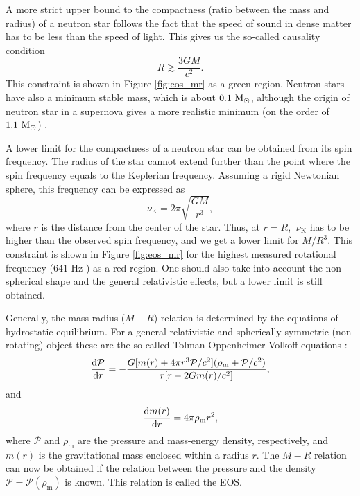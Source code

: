 \documentclass{wihuri}
\def\be{\begin{equation}}
\def\ee{\end{equation}}
\def\msun{{\rm M_{\odot}}}
\def\d{{\rm d}}
\begin{document}
A more strict upper bound to the compactness (ratio between the mass and radius) of a neutron star follows
the fact \cite{rhoades} %
that the speed of sound in dense matter has to be less than the speed of light. This gives us the so-called causality condition
\be \label{eq:causality}
 R \gtrsim \frac{3GM}{c^{2}}.
\ee 
This constraint is shown in Figure \ref{fig:eos_mr} as a green region. Neutron stars have also a minimum stable mass, which is about $0.1 ~\msun$, although the origin of neutron star in a supernova gives a more realistic minimum (on the order of $1.1 ~\msun$) \cite{lattimer2013}.

A lower limit for the compactness of a neutron star can be obtained from its spin frequency. The radius of the star cannot extend further than the point where the spin frequency equals to the Keplerian frequency. Assuming a rigid Newtonian sphere, this frequency can be expressed as
\be \label{eq:keplerian}
\nu_{\mathrm{K}} = 2 \pi \sqrt{\frac{GM}{r^{3}}},
\ee 
where $r$ is the distance from the center of the star. Thus, at $r=R$, $~\nu_{\mathrm{K}}$ has to be higher than the observed spin frequency, and we get a lower limit for $M/R^{3}$. This constraint is shown in Figure \ref{fig:eos_mr} for the highest measured rotational frequency ($641$ Hz \cite{lattimer}) as a red region. One should also take into account the non-spherical shape and the general relativistic effects, but a lower limit is still obtained.








Generally, the mass-radius ($M-R$) relation is determined by the equations of hydrostatic equilibrium. For a general relativistic and spherically symmetric (non-rotating) object %
these are the so-called Tolman-Oppenheimer-Volkoff equations %
\cite{tolman} \cite{oppenheimer}:
\be
 \frac{\d \mathcal{P}}{\d r} = -\frac{G[m(r)+4 \pi r^{3}\mathcal{P}/c^{2}](\rho_{\mathrm{m}} + \mathcal{P}/c^{2})}{r[r-2Gm(r)/c^{2}]},
\ee 
and
\be
 \frac{\d m(r)}{\d r } = 4 \pi \rho_{\mathrm{m}} r^{2},
\ee
where $\mathcal{P}$ and $\rho_{\mathrm{m}}$ are the pressure and mass-energy density, respectively, and $m(r)$ is the gravitational mass enclosed within a radius $r$. The $M-R$ relation can now be obtained if the relation between the pressure and the density $\mathcal{P}=\mathcal{P}(\rho_{\mathrm{m}})$ is known. This relation is called the EOS. 
\end{document}
